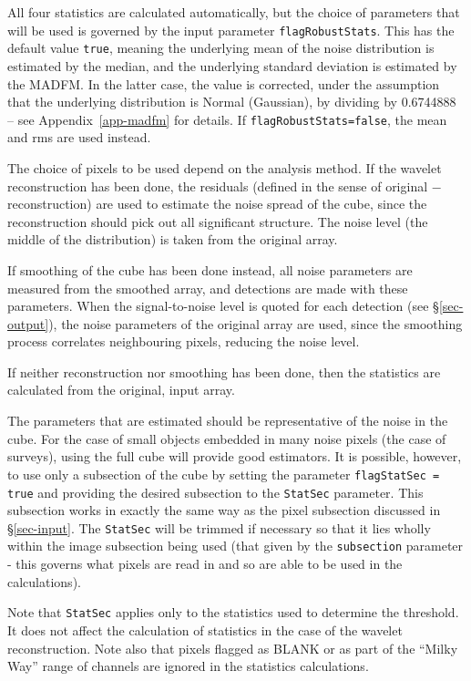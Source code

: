 All four statistics are calculated automatically, but the choice of
parameters that will be used is governed by the input parameter
\texttt{flagRobustStats}. This has the default value \texttt{true},
meaning the underlying mean of the noise distribution is estimated by
the median, and the underlying standard deviation is estimated by the
MADFM. In the latter case, the value is corrected, under the
assumption that the underlying distribution is Normal (Gaussian), by
dividing by 0.6744888 -- see Appendix~\ref{app-madfm} for details. If
\texttt{flagRobustStats=false}, the mean and rms are used instead.

The choice of pixels to be used depend on the analysis method. If the
wavelet reconstruction has been done, the residuals (defined
in the sense of original $-$ reconstruction) are used to estimate the
noise spread of the cube, since the reconstruction should pick out
all significant structure. The noise level (the middle of the
distribution) is taken from the original array.

If smoothing of the cube has been done instead, all noise parameters
are measured from the smoothed array, and detections are made with
these parameters. When the signal-to-noise level is quoted for each
detection (see \S\ref{sec-output}), the noise parameters of the
original array are used, since the smoothing process correlates
neighbouring pixels, reducing the noise level.

If neither reconstruction nor smoothing has been done, then the
statistics are calculated from the original, input array. 

The parameters that are estimated should be representative of the
noise in the cube. For the case of small objects embedded in many
noise pixels (\eg the case of \hi surveys), using the full cube will
provide good estimators. It is possible, however, to use only a
subsection of the cube by setting the parameter \texttt{flagStatSec =
  true} and providing the desired subsection to the \texttt{StatSec}
parameter. This subsection works in exactly the same way as the pixel
subsection discussed in \S\ref{sec-input}. The \texttt{StatSec} will
be trimmed if necessary so that it lies wholly within the image
subsection being used (\ie that given by the \texttt{subsection}
parameter - this governs what pixels are read in and so are able to be
used in the calculations).

Note that \texttt{StatSec} applies only to the statistics used to
determine the threshold. It does not affect the calculation of
statistics in the case of the wavelet reconstruction. Note also that
pixels flagged as BLANK or as part of the ``Milky Way'' range of
channels are ignored in the statistics calculations.

